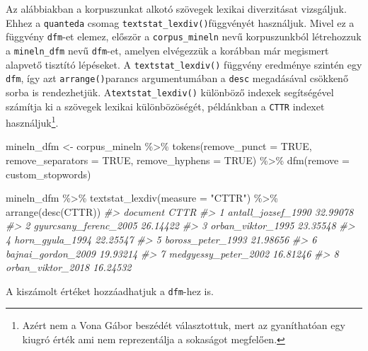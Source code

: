 \documentclass[
]{book}
\newenvironment{Shaded}{\begin{snugshade}}{\end{snugshade}}
\newcommand{\AttributeTok}[1]{\textcolor[rgb]{0.77,0.63,0.00}{#1}}
\newcommand{\CommentTok}[1]{\textcolor[rgb]{0.56,0.35,0.01}{\textit{#1}}}
\newcommand{\ConstantTok}[1]{\textcolor[rgb]{0.00,0.00,0.00}{#1}}
\newcommand{\FunctionTok}[1]{\textcolor[rgb]{0.00,0.00,0.00}{#1}}
\newcommand{\NormalTok}[1]{#1}
\newcommand{\OtherTok}[1]{\textcolor[rgb]{0.56,0.35,0.01}{#1}}
\newcommand{\SpecialCharTok}[1]{\textcolor[rgb]{0.00,0.00,0.00}{#1}}
\newcommand{\StringTok}[1]{\textcolor[rgb]{0.31,0.60,0.02}{#1}}
\begin{document}
Az alábbiakban a korpuszunkat alkotó szövegek lexikai diverzitásat
vizsgáljuk. Ehhez a \texttt{quanteda} csomag
\texttt{textstat\_lexdiv()}függvényét használjuk. Mivel ez a függvény
\texttt{dfm}-et elemez, először a \texttt{corpus\_mineln} nevű
korpuszunkból létrehozzuk a \texttt{mineln\_dfm} nevű \texttt{dfm}-et,
amelyen elvégezzük a korábban már megismert alapvető tisztító lépéseket.
A \texttt{textstat\_lexdiv()} függvény eredménye szintén egy
\texttt{dfm}, így azt \texttt{arrange()}parancs argumentumában a
\texttt{desc} megadásával csökkenő sorba is rendezhetjük.
A\texttt{textstat\_lexdiv()} különböző indexek segítségével számítja ki
a szövegek lexikai különbözöségét, példánkban a \texttt{CTTR} indexet
használjuk\footnote{Azért nem a Vona Gábor beszédét választottuk, mert
  az gyaníthatóan egy kiugró érték ami nem reprezentálja a sokaságot
  megfelően.}.

\begin{Shaded}
\begin{Highlighting}[]
\NormalTok{mineln\_dfm }\OtherTok{\textless{}{-}}\NormalTok{ corpus\_mineln }\SpecialCharTok{\%\textgreater{}\%}
  \FunctionTok{tokens}\NormalTok{(}\AttributeTok{remove\_punct =} \ConstantTok{TRUE}\NormalTok{, }\AttributeTok{remove\_separators =} \ConstantTok{TRUE}\NormalTok{, }\AttributeTok{remove\_hyphens =} \ConstantTok{TRUE}\NormalTok{) }\SpecialCharTok{\%\textgreater{}\%}
  \FunctionTok{dfm}\NormalTok{(}\AttributeTok{remove =}\NormalTok{ custom\_stopwords)}

\NormalTok{mineln\_dfm }\SpecialCharTok{\%\textgreater{}\%}
  \FunctionTok{textstat\_lexdiv}\NormalTok{(}\AttributeTok{measure =} \StringTok{"CTTR"}\NormalTok{) }\SpecialCharTok{\%\textgreater{}\%}
  \FunctionTok{arrange}\NormalTok{(}\FunctionTok{desc}\NormalTok{(CTTR))}
\CommentTok{\#\textgreater{}                document     CTTR}
\CommentTok{\#\textgreater{} 1    antall\_jozsef\_1990 32.99078}
\CommentTok{\#\textgreater{} 2 gyurcsany\_ferenc\_2005 26.14422}
\CommentTok{\#\textgreater{} 3     orban\_viktor\_1995 23.35548}
\CommentTok{\#\textgreater{} 4       horn\_gyula\_1994 22.25547}
\CommentTok{\#\textgreater{} 5     boross\_peter\_1993 21.98656}
\CommentTok{\#\textgreater{} 6    bajnai\_gordon\_2009 19.93214}
\CommentTok{\#\textgreater{} 7  medgyessy\_peter\_2002 16.81246}
\CommentTok{\#\textgreater{} 8     orban\_viktor\_2018 16.24532}
\end{Highlighting}
\end{Shaded}

A kiszámolt értéket hozzáadhatjuk a \texttt{dfm}-hez is.
\end{document}
